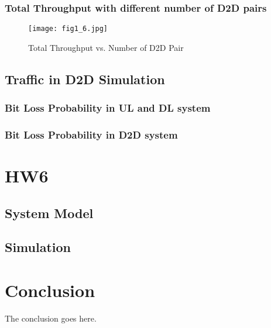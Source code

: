 \documentclass[conference]{IEEEtran}
\begin{document}
\subsubsection{Total Throughput with different number of D2D pairs}
\begin{figure}[htbp]
    \centering
    \texttt{[image: fig1\_6.jpg]}
    \caption{Total Throughput vs. Number of D2D Pair}
    \label{fig:d2d_num}
\end{figure}
\subsection{Traffic in D2D Simulation}
\subsubsection{Bit Loss Probability in UL and DL system}
\subsubsection{Bit Loss Probability in D2D system}
\section{HW6}
\subsection{System Model}
\subsection{Simulation}
\section{Conclusion}
The conclusion goes here.
\end{document}
